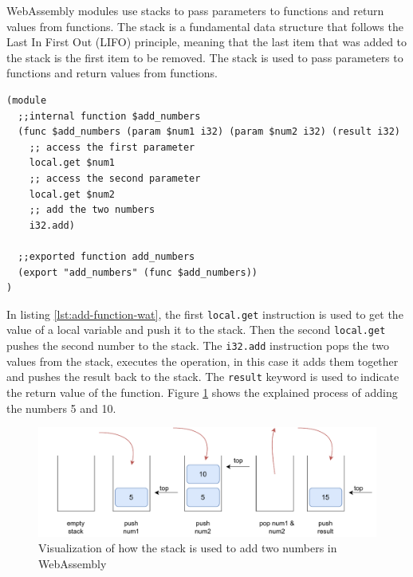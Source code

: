 WebAssembly modules use stacks to pass parameters to functions and return values from functions. The stack is a fundamental data structure that follows the Last In First Out (LIFO) principle, meaning that the last item that was added to the stack is the first item to be removed. The stack is used to pass parameters to functions and return values from functions. 
%
\begin{lstlisting}[frame=lines, style=Wasm, caption={A simple functions that adds two numbers and returns the value}, showstringspaces=false, captionpos=b, label={lst:add-function-wat}]
(module
  ;;internal function $add_numbers
  (func $add_numbers (param $num1 i32) (param $num2 i32) (result i32)
    ;; access the first parameter
    local.get $num1
    ;; access the second parameter
    local.get $num2
    ;; add the two numbers
    i32.add)

  ;;exported function add_numbers
  (export "add_numbers" (func $add_numbers))
)
\end{lstlisting}
%
In listing \ref{lst:add-function-wat}, the first \texttt{local.get} instruction is used to get the value of a local variable and push it to the stack. Then the second \texttt{local.get} pushes the second number to the stack. The \texttt{i32.add} instruction pops the two values from the stack, executes the operation, in this case it adds them together and pushes the result back to the stack. The \texttt{result} keyword is used to indicate the return value of the function. Figure \ref{fig:stack_wasm_add_num} shows the explained process of adding the numbers 5 and 10.

\begin{figure}[H]
  \centering
      \includegraphics[width=1\linewidth]{images/wasm/stack_add_num_wasm.drawio.pdf}
  \caption{Visualization of how the stack is used to add two numbers in WebAssembly}
  \label{fig:stack_wasm_add_num}
\end{figure}